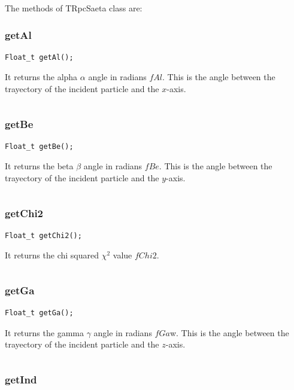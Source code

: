 \documentclass[a4paper]{book}
\begin{document}
The methods of TRpcSaeta class are:

\subsubsection{getAl}

\begin{lstlisting}[style=customc]
Float_t getAl();
\end{lstlisting}

It returns the alpha $\alpha$ angle in radians $fAl$. This is the angle between the trayectory of the incident particle and the $x$-axis.

\[\]

\subsubsection{getBe}

\begin{lstlisting}[style=customc]
Float_t getBe();
\end{lstlisting}

It returns the beta $\beta$ angle in radians $fBe$. This is the angle between the trayectory of the incident particle and the $y$-axis.

\[\]

\subsubsection{getChi2}

\begin{lstlisting}[style=customc]
Float_t getChi2();
\end{lstlisting}

It returns the chi squared $\chi^2$ value $fChi2$.

\[\]

\subsubsection{getGa}

\begin{lstlisting}[style=customc]
Float_t getGa();
\end{lstlisting}

It returns the gamma $\gamma$ angle in radians $fGa$w. This is the angle between the trayectory of the incident particle and the $z$-axis.

\[\]

\subsubsection{getInd}
\end{document}
